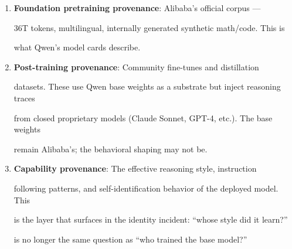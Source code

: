 \begin{enumerate}











\item \textbf{Foundation pretraining provenance}: Alibaba's official corpus ---





  36T tokens, multilingual, internally generated synthetic math/code. This is





  what Qwen's model cards describe.











\item \textbf{Post-training provenance}: Community fine-tunes and distillation





  datasets. These use Qwen base weights as a substrate but inject reasoning traces





  from closed proprietary models (Claude Sonnet, GPT-4, etc.). The base weights





  remain Alibaba's; the behavioral shaping may not be.











\item \textbf{Capability provenance}: The effective reasoning style, instruction





  following patterns, and self-identification behavior of the deployed model. This





  is the layer that surfaces in the identity incident: ``whose style did it learn?''





  is no longer the same question as ``who trained the base model?''











\end{enumerate}











